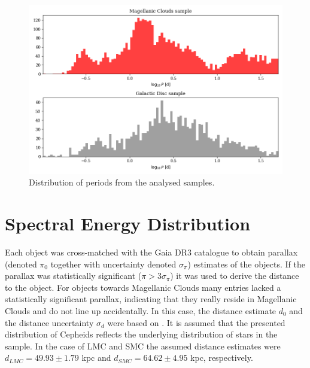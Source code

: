 \documentclass{pracalicmgr}
\begin{document}
\begin{figure}
    \includegraphics[scale=0.5]{plots/periods.png}
    \caption{Distribution of periods from the analysed samples.}
    \label{periods}
\end{figure}


\section{Spectral Energy Distribution}
Each object was cross-matched with the Gaia DR3 catalogue to obtain parallax (denoted $\pi_0$ together with uncertainty denoted $\sigma_{\pi}$) estimates of the objects. If the parallax was statistically significant ($\pi>3\sigma_{\pi}$)
it was used to derive the distance to the object. For objects towards Magellanic Clouds many entries lacked a statistically significant parallax, indicating that they really reside in Magellanic Clouds
and do not line up accidentally.
In this case, the distance estimate $d_0$ and the distance uncertainty $\sigma_d$ were based on \citet{jacyszyn-dobrzeniecka_ogle-ing_2016}. It is assumed that the presented distribution
of Cepheids reflects the underlying distribution of stars in the sample.
In the case of LMC and SMC the assumed distance estimates were $d_{LMC}=49.93\pm1.79$ kpc and $d_{SMC}=64.62\pm4.95$ kpc, respectively. 
\end{document}
